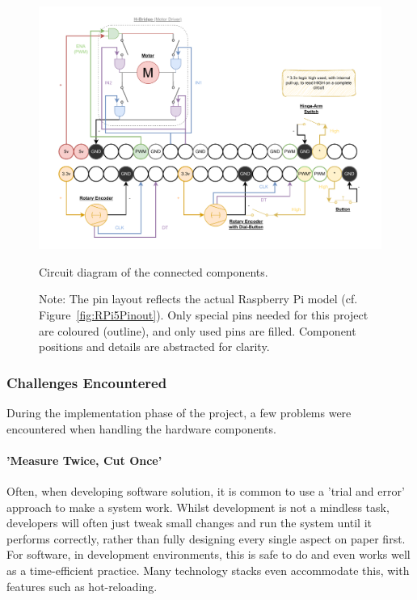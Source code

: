             \begin{figure}[h]
                \centering
                \includegraphics[width=\linewidth]{images/CircuitDiagram.pdf}
                \caption{Circuit diagram of the connected components.}
                \label{fig:circuitDiagram}
                \caption*{Note: The pin layout reflects the actual Raspberry Pi model (cf. Figure~\ref{fig:RPi5Pinout}). Only special pins needed for this project are coloured (outline), and only used pins are filled. Component positions and details are abstracted for clarity.}
            \end{figure}
        
            \subsubsection{Challenges Encountered}
    
                During the implementation phase of the project, a few problems were encountered when handling the hardware components.
    
                \paragraph{'Measure Twice, Cut Once'}
    
                    Often, when developing software solution, it is common to use a 'trial and error' approach to make a system work. Whilst development is not a mindless task, developers will often just tweak small changes and run the system until it performs correctly, rather than fully designing every single aspect on paper first. For software, in development environments, this is safe to do and even works well as a time-efficient practice. Many technology stacks even accommodate this, with features such as hot-reloading.
    

